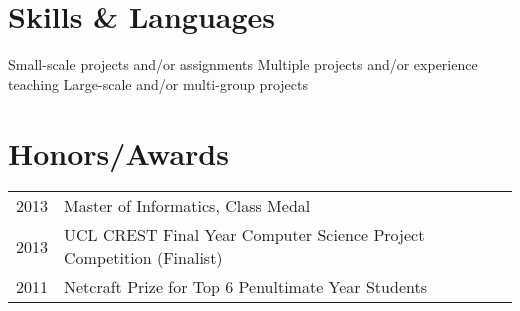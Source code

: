 \documentclass[10pt]{article}
\begin{document}

\vspace{-1em}
\section{Skills \& Languages}
\vspace{-1em}

\begin{multicols}{4}
\raggedcolumns

\begin{itemize}

\renewcommand{\labelitemi}{}

\renewcommand{\skill}{\textnormal}

\setlength{\itemsep}{1pt}
\setlength{\parskip}{0pt}
\setlength{\parsep}{0pt}

\skills{\asthree}{\oneskill}
\skills{\bash}{\twoskill}
\skills{\ccpp}{\twoskill}
\skills{\git}{\twoskill}
\skills{\html}{\oneskill}
\skills{\java}{\threeskill}
\skills{\js}{\oneskill}
\skills{\LaTeX}{\twoskill}
\skills{\matlab}{\oneskill}
\skills{\python}{\twoskill}
\skills{\ruby}{\oneskill}
\skills{\svn}{\oneskill}
\skills{\scala}{\oneskill}

\end{itemize}

\end{multicols}
\vspace{-1em}
  \begin{footnotesize}
    \oneskill Small-scale projects and/or assignments \hfill 
    \twoskill Multiple projects and/or experience teaching \hfill
    \threeskill Large-scale and/or multi-group projects
  \end{footnotesize}


\vspace{0.75em}
\section{Honors/Awards}
\begin{tabularx}{\textwidth}{r|X}
2013 & Master of Informatics, Class Medal \\
2013 & UCL CREST Final Year Computer Science Project Competition (Finalist) \\
2011 & Netcraft Prize for Top 6 Penultimate Year Students \\
\end{tabularx}
\end{document}

